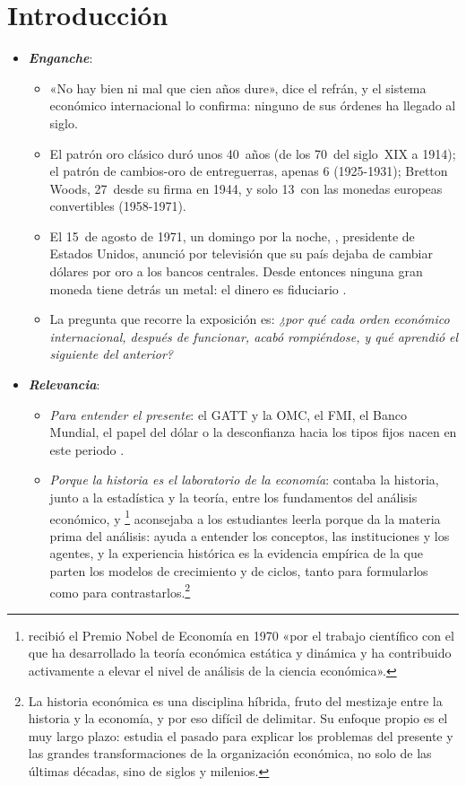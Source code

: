 \documentclass[11pt]{article}
\begin{document}
\tceetitulo

\section*{Introducción}

\begin{itemize}
\item \textbf{\emph{Enganche}}:
  \begin{itemize}
  \item «No hay bien ni mal que cien años dure», dice el refrán, y el sistema económico internacional lo confirma: ninguno de sus órdenes ha llegado al siglo.
  \item El patrón oro clásico duró unos 40~años (de los 70~del siglo~XIX a 1914); el patrón de cambios-oro de entreguerras, apenas 6 (1925-1931); Bretton Woods, 27~desde su firma en 1944, y solo 13~con las monedas europeas convertibles (1958-1971).
  \item El 15~de agosto de 1971, un domingo por la noche, , presidente de Estados Unidos, anunció por televisión que su país dejaba de cambiar dólares por oro a los bancos centrales\nocite{FedHistory2026Convertibilidad}. Desde entonces ninguna gran moneda tiene detrás un metal: el dinero es fiduciario .
  \item La pregunta que recorre la exposición es: \emph{¿por qué cada orden económico internacional, después de funcionar, acabó rompiéndose, y qué aprendió el siguiente del anterior?}
  \end{itemize}

\item \textbf{\emph{Relevancia}}:
  \begin{itemize}
  \item \emph{Para entender el presente}: el GATT y la OMC, el FMI, el Banco Mundial, el papel del dólar o la desconfianza hacia los tipos fijos nacen en este periodo    .
  \item \emph{Porque la historia es el laboratorio de la economía}:  contaba la historia, junto a la estadística y la teoría, entre los fundamentos del análisis económico, y \footnote{ recibió el Premio Nobel de Economía en 1970 «por el trabajo científico con el que ha desarrollado la teoría económica estática y dinámica y ha contribuido activamente a elevar el nivel de análisis de la ciencia económica»\nocite{Nobel1970Samuelson}.} aconsejaba a los estudiantes leerla porque da la materia prima del análisis: ayuda a entender los conceptos, las instituciones y los agentes, y la experiencia histórica es la evidencia empírica de la que parten los modelos de crecimiento y de ciclos, tanto para formularlos como para contrastarlos.\footnote{La historia económica es una disciplina híbrida, fruto del mestizaje entre la historia y la economía, y por eso difícil de delimitar. Su enfoque propio es el muy largo plazo: estudia el pasado para explicar los problemas del presente y las grandes transformaciones de la organización económica, no solo de las últimas décadas, sino de siglos y milenios\nocite{Comin2014Historia}.

}
\end{itemize}
\end{itemize}
\end{document}
